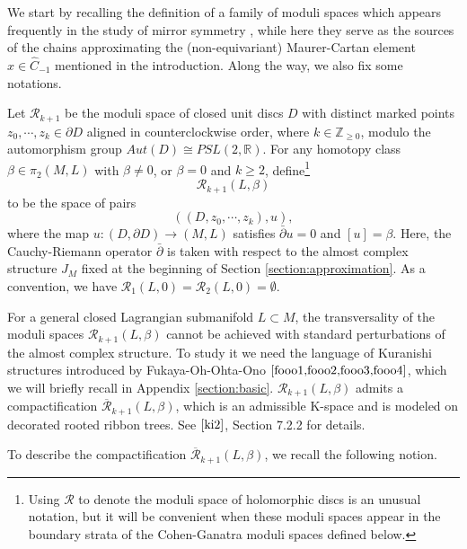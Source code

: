\documentclass[a4paper]{article}
\numberwithin{equation}{section}
\begin{document}
We start by recalling the definition of a family of moduli spaces which appears frequently in the study of mirror symmetry \cite{fooo1}, while here they serve as the sources of the chains approximating the (non-equivariant) Maurer-Cartan element $x\in\widehat{C}_{-1}$ mentioned in the introduction. Along the way, we also fix some notations.

Let $\mathcal{R}_{k+1}$ be the moduli space of closed unit discs $D$ with distinct marked points $z_0,\cdots,z_k\in\partial D$ aligned in counterclockwise order, where $k\in\mathbb{Z}_{\geq0}$, modulo the automorphism group $\mathit{Aut}(D)\cong\mathit{PSL}(2,\mathbb{R})$. For any homotopy class $\beta\in\pi_2(M,L)$ with $\beta\neq0$, or $\beta=0$ and $k\geq2$, define\footnote{Using $\mathcal{R}$ to denote the moduli space of holomorphic discs is an unusual notation, but it will be convenient when these moduli spaces appear in the boundary strata of the Cohen-Ganatra moduli spaces defined below.}
\begin{equation}
\mathcal{R}_{k+1}(L,\beta)
\end{equation}
to be the space of pairs
\begin{equation}\label{eq:pair1}
\left((D,z_0,\cdots,z_k),u\right), 
\end{equation}
where the map $u:(D,\partial D)\rightarrow(M,L)$ satisfies $\bar{\partial}u=0$ and $[u]=\beta$. Here, the Cauchy-Riemann operator $\bar{\partial}$ is taken with respect to the almost complex structure $J_M$ fixed at the beginning of Section \ref{section:approximation}. As a convention, we have $\mathcal{R}_1(L,0)=\mathcal{R}_2(L,0)=\emptyset$.

For a general closed Lagrangian submanifold $L\subset M$, the transversality of the moduli spaces $\mathcal{R}_{k+1}(L,\beta)$ cannot be achieved with standard perturbations of the almost complex structure. To study it we need the language of Kuranishi structures introduced by Fukaya-Oh-Ohta-Ono $\cite{fooo1,fooo2,fooo3,fooo4}$, which we will briefly recall in Appendix \ref{section:basic}. $\mathcal{R}_{k+1}(L,\beta)$ admits a compactification $\overline{\mathcal{R}}_{k+1}(L,\beta)$, which is an admissible K-space and is modeled on decorated rooted ribbon trees. See $\cite{ki2}$, Section 7.2.2 for details. 

To describe the compactification $\overline{\mathcal{R}}_{k+1}(L,\beta)$, we recall the following notion.
\end{document}

